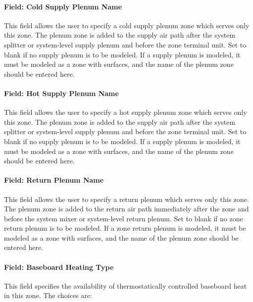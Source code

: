 \paragraph{Field: Cold Supply Plenum Name}\label{field-cold-supply-plenum-name}

This field allows the user to specify a cold supply plenum zone which serves only this zone. The plenum zone is added to the supply air path after the system splitter or system-level supply plenum and before the zone terminal unit. Set to blank if no supply plenum is to be modeled. If a supply plenum is modeled, it must be modeled as a zone with surfaces, and the name of the plenum zone should be entered here.

\paragraph{Field: Hot Supply Plenum Name}\label{field-hot-supply-plenum-name}

This field allows the user to specify a hot supply plenum zone which serves only this zone. The plenum zone is added to the supply air path after the system splitter or system-level supply plenum and before the zone terminal unit. Set to blank if no supply plenum is to be modeled. If a supply plenum is modeled, it must be modeled as a zone with surfaces, and the name of the plenum zone should be entered here.

\paragraph{Field: Return Plenum Name}\label{field-return-plenum-name-5}

This field allows the user to specify a return plenum which serves only this zone. The plenum zone is added to the return air path immediately after the zone and before the system mixer or system-level return plenum. Set to blank if no zone return plenum is to be modeled. If a zone return plenum is modeled, it must be modeled as a zone with surfaces, and the name of the plenum zone should be entered here.

\paragraph{Field: Baseboard Heating Type}\label{field-baseboard-heating-type-11}

This field specifies the availability of thermostatically controlled baseboard heat in this zone. The choices are:

